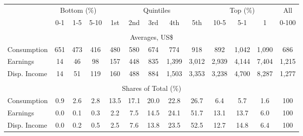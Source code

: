 \begin{tabular}{l c c c| c c c c c| c c c| c}
\toprule
&\multicolumn{3}{c|}{Bottom (\%)} & \multicolumn{5}{c|}{Quintiles} & \multicolumn{3}{c|}{Top (\%)} & All  \\
& 0-1 & 1-5 & 5-10 &  1st & 2nd & 3rd & 4th & 5th & 10-5 & 5-1 & 1 & 0-100 \\
\midrule \\
\multicolumn{13}{c}{Averages, US\$} \\
\midrule
Consumption  & 651  & 473  & 416  & 480  & 580  & 674  & 774  & 918  & 892  & 1,042  & 1,090  & 686 \\
Earnings         & 14 & 46 & 98 & 157 & 448 & 835 & 1,399 & 3,012 & 2,939 & 4,144 & 7,404 & 1,215 \\
Disp. Income & 14 & 51 & 119 & 160 & 488 & 884 & 1,503 & 3,353 & 3,238 & 4,700 & 8,287 & 1,277 \\
\midrule \\
\multicolumn{13}{c}{Shares of Total (\%)} \\
\midrule
Consumption  & 0.9   & 2.6   & 2.8   & 13.5   & 17.1   & 20.0   & 22.8   & 26.7   & 6.4   & 5.7   & 1.6   & 100 \\
Earnings         & 0.0  & 0.1  & 0.3  & 2.2  & 7.5  & 14.5  & 24.1  & 51.7  & 13.1  & 13.7  & 6.0  & 100 \\
Disp. Income & 0.0  & 0.2  & 0.5  & 2.5  & 7.6  & 13.8  & 23.5  & 52.5  & 12.7  & 14.8  & 6.4  & 100 \\
\bottomrule
\end{tabular}